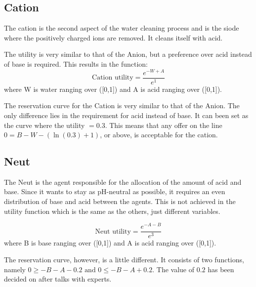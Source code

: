 



\subsection{Cation}
The cation is the second aspect of the water cleaning process and is the siode where the positively charged ions are removed. It cleans itself with acid. %

The utility is very similar to that of the Anion, but a preference over acid instead of base is required. This results in the function:
\[
\text{Cation utility} = \frac{e^{-W+A}}{e^1}
\] 
where W is water ranging over ([0,1]) and A is acid ranging over ([0,1]).

The reservation curve for the Cation is very similar to that of the Anion. The only difference lies in the requirement for acid instead of base. It can been set as the curve where the utility $= 0.3$. This means that any offer on the line $0 = B - W - (\ln(0.3)+1)$, or above, is acceptable for the cation.

\subsection{Neut}
The Neut is the agent responsible for the allocation of the amount of acid and base. Since it wants to stay as pH-neutral as possible, it requires an even distribution of base and acid between the agents. This is not achieved in the utility function which is the same as the others, just different variables.

\[
\text{Neut utility} = \frac{e^{-A-B}}{e^3}
\] 
where B is base ranging over ([0,1]) and A is acid ranging over ([0,1]).

The reservation curve, however, is a little different. It consists of two functions, namely $0 \geq -B - A - 0.2 \text{ and }  0 \leq -B - A + 0.2$. The value of $0.2$ has been decided on after talks with experts. 


